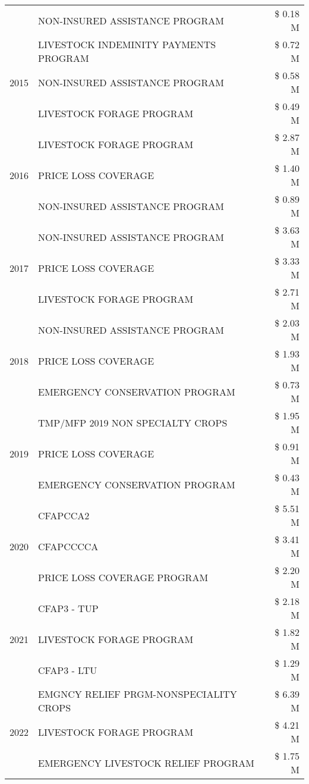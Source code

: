 \begin{tabular}{llr}
 & NON-INSURED ASSISTANCE PROGRAM & \$ 0.18 M \\
\cline{1-3}
\multirow[t]{3}{*}{2015} & LIVESTOCK INDEMINITY PAYMENTS PROGRAM & \$ 0.72 M \\
 & NON-INSURED ASSISTANCE PROGRAM & \$ 0.58 M \\
 & LIVESTOCK FORAGE PROGRAM & \$ 0.49 M \\
\cline{1-3}
\multirow[t]{3}{*}{2016} & LIVESTOCK FORAGE PROGRAM & \$ 2.87 M \\
 & PRICE LOSS COVERAGE & \$ 1.40 M \\
 & NON-INSURED ASSISTANCE PROGRAM & \$ 0.89 M \\
\cline{1-3}
\multirow[t]{3}{*}{2017} & NON-INSURED ASSISTANCE PROGRAM & \$ 3.63 M \\
 & PRICE LOSS COVERAGE & \$ 3.33 M \\
 & LIVESTOCK FORAGE PROGRAM & \$ 2.71 M \\
\cline{1-3}
\multirow[t]{3}{*}{2018} & NON-INSURED ASSISTANCE PROGRAM & \$ 2.03 M \\
 & PRICE LOSS COVERAGE & \$ 1.93 M \\
 & EMERGENCY CONSERVATION PROGRAM & \$ 0.73 M \\
\cline{1-3}
\multirow[t]{3}{*}{2019} & TMP/MFP 2019 NON SPECIALTY CROPS & \$ 1.95 M \\
 & PRICE LOSS COVERAGE & \$ 0.91 M \\
 & EMERGENCY CONSERVATION PROGRAM & \$ 0.43 M \\
\cline{1-3}
\multirow[t]{3}{*}{2020} & CFAPCCA2 & \$ 5.51 M \\
 & CFAPCCCCA & \$ 3.41 M \\
 & PRICE LOSS COVERAGE PROGRAM & \$ 2.20 M \\
\cline{1-3}
\multirow[t]{3}{*}{2021} & CFAP3 - TUP & \$ 2.18 M \\
 & LIVESTOCK FORAGE PROGRAM & \$ 1.82 M \\
 & CFAP3 - LTU & \$ 1.29 M \\
\cline{1-3}
\multirow[t]{3}{*}{2022} & EMGNCY RELIEF PRGM-NONSPECIALITY CROPS & \$ 6.39 M \\
 & LIVESTOCK FORAGE PROGRAM & \$ 4.21 M \\
 & EMERGENCY LIVESTOCK RELIEF PROGRAM & \$ 1.75 M \\
\cline{1-3}
\bottomrule
\end{tabular}
